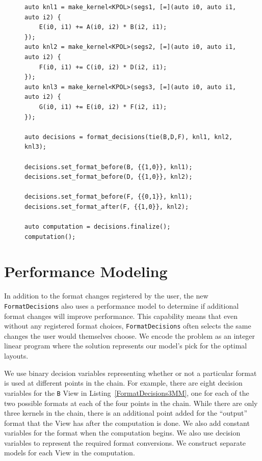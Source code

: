 \documentclass[sigconf,review=true]{acmart}
\begin{document}
\begin{figure}
\begin{lstlisting}[caption={The 3MM benchmark implemented using FormatDecisions.},
	label={FormatDecisions3MM}]
auto knl1 = make_kernel<KPOL>(segs1, [=](auto i0, auto i1, auto i2) {
	E(i0, i1) += A(i0, i2) * B(i2, i1);
});
auto knl2 = make_kernel<KPOL>(segs2, [=](auto i0, auto i1, auto i2) {
	F(i0, i1) += C(i0, i2) * D(i2, i1);
});
auto knl3 = make_kernel<KPOL>(segs3, [=](auto i0, auto i1, auto i2) {
	G(i0, i1) += E(i0, i2) * F(i2, i1);
});

auto decisions = format_decisions(tie(B,D,F), knl1, knl2, knl3);

decisions.set_format_before(B, {{1,0}}, knl1);
decisions.set_format_before(D, {{1,0}}, knl2);

decisions.set_format_before(F, {{0,1}}, knl1);
decisions.set_format_after(F, {{1,0}}, knl2);

auto computation = decisions.finalize();
computation();
\end{lstlisting}
\end{figure}


\section{Performance Modeling}

In addition to the format changes registered by the user, the new \verb.FormatDecisions. also uses a performance model to determine if additional format changes will improve performance. 
This capability means that even without any registered format choices, \verb.FormatDecisions. often selects the same changes the user would themselves choose. 
We encode the problem as an integer linear program where the solution represents our model's pick for the optimal layouts.


We use binary decision variables representing whether or not a particular format is used at different points in the chain. 
For example, there are eight decision variables for the \verb.B. View in Listing~\ref{FormatDecisions3MM}, one for each of the two possible formats at each of the four points in the chain. 
While there are only three kernels in the chain, there is an additional point added for the \enquote{output} format that the View has after the computation is done.
We also add constant variables for the format when the computation begins. 
We also use decision variables to represent the required format conversions.
We construct separate models for each View in the computation. 
\end{document}
